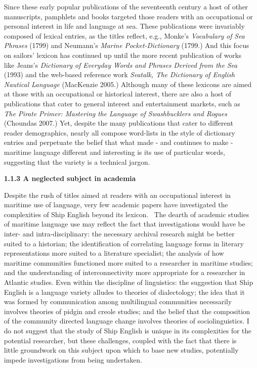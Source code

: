 \begin{styleNormali}
Since these early popular publications of the seventeenth century a host of other manuscripts, pamphlets and books targeted those readers with an occupational or personal interest in life and language at sea. These publications were invariably composed of lexical entries, as the titles reflect, e.g., Monke’s \textit{Vocabulary of Sea Phrases} (1799) and Neumann’s \textit{Marine Pocket-Dictionary }(1799.) And this focus on sailors’ lexicon has continued up until the more recent publication of works like Jeans’s \textit{Dictionary of Everyday Words and Phrases Derived from the Sea} (1993) and the web-based reference work \textit{Seatalk, The Dictionary of English Nautical Language }(MacKenzie 2005.) Although many of these lexicons are aimed at those with an occupational or historical interest, there are also a host of publications that cater to general interest and entertainment markets, such as \textit{The Pirate Primer: Mastering the Language of Swashbucklers and Rogues }(Choundas 2007.) Yet, despite the many publications that cater to different reader demographics, nearly all compose word-lists in the style of dictionary entries and perpetuate the belief that what made - and continues to make - maritime language different and interesting is its use of particular words, suggesting that the variety is a technical jargon. 
\end{styleNormali}

\begin{styleNormali}
\textbf{1.1.3 A neglected subject in academia}
\end{styleNormali}

\begin{styleNormali}
Despite the rush of titles aimed at readers with an occupational interest in maritime use of language, very few academic papers have investigated the complexities of Ship English beyond its lexicon. \ The dearth of academic studies of maritime language use may reflect the fact that investigations would have be inter- and intra-disciplinary: the necessary archival research might be better suited to a historian; the identification of correlating language forms in literary representations more suited to a literature specialist; the analysis of how maritime communities functioned more suited to a researcher in maritime studies; and the understanding of interconnectivity more appropriate for a researcher in Atlantic studies. Even within the discipline of linguistics: the suggestion that Ship English is a language variety alludes to theories of dialectology; the idea that it was formed by communication among multilingual communities necessarily involves theories of pidgin and creole studies; and the belief that the composition of the community directed language change involves theories of sociolinguistics. I do not suggest that the study of Ship English is unique in its complexities for the potential researcher, but these challenges, coupled with the fact that there is little groundwork on this subject upon which to base new studies, potentially impede investigations from being undertaken. 
\end{styleNormali}

